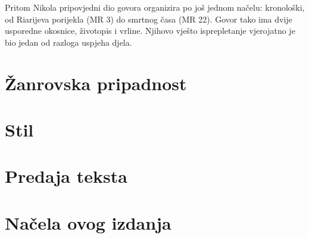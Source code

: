 \documentclass[a5paper,twoside]{article}
\begin{document}
Pritom Nikola pripovjedni dio govora organizira po još jednom načelu: kronološki, od Riarijeva porijekla (MR 3) do smrtnog časa (MR 22). Govor tako ima dvije usporedne okosnice, životopis i vrline. Njihovo vješto isprepletanje vjerojatno je bio jedan od razloga uspjeha djela.

\section{Žanrovska pripadnost}

\section{Stil}

\section{Predaja teksta}

\section{Načela ovog izdanja}
\end{document}
